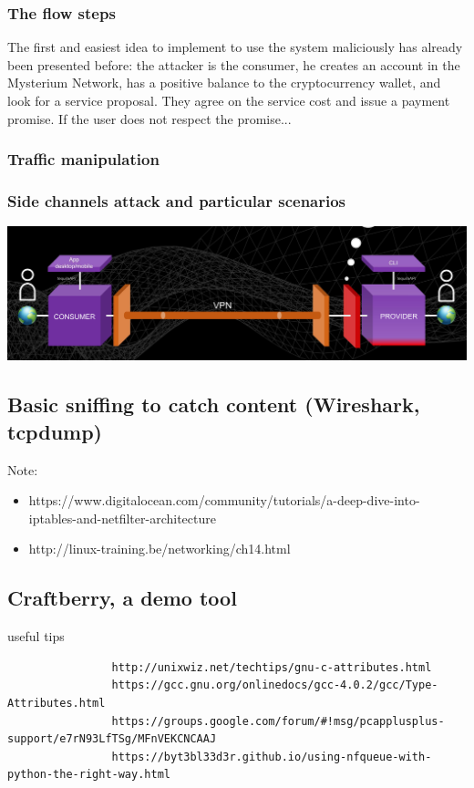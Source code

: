 \documentclass[]{article}
\begin{document}
	
	\subsubsection{The flow steps}
	The first and easiest idea to implement to use the system maliciously has already been presented before: the attacker is the consumer, he creates an account in the Mysterium Network, has a positive balance to the cryptocurrency wallet, and look for a service proposal. They agree on the service cost and issue a payment promise. If the user does not respect the promise...




	



	\subsubsection{Traffic manipulation}


	\subsubsection{Side channels attack and particular scenarios}


	\includegraphics[width=\linewidth]{"images/client_server_vpn_connection.png"}



	\subsection{Basic sniffing to catch content (Wireshark, tcpdump)}
	Note:
	\begin{itemize}
		\item https://www.digitalocean.com/community/tutorials/a-deep-dive-into-iptables-and-netfilter-architecture
		\item http://linux-training.be/networking/ch14.html
	\end{itemize}
	
	\subsection{Craftberry, a demo tool}
			useful tips
			\begin{verbatim}
				http://unixwiz.net/techtips/gnu-c-attributes.html
				https://gcc.gnu.org/onlinedocs/gcc-4.0.2/gcc/Type-Attributes.html
				https://groups.google.com/forum/#!msg/pcapplusplus-support/e7rN93LfTSg/MFnVEKCNCAAJ
				https://byt3bl33d3r.github.io/using-nfqueue-with-python-the-right-way.html
			\end{verbatim}
			
\end{document}
